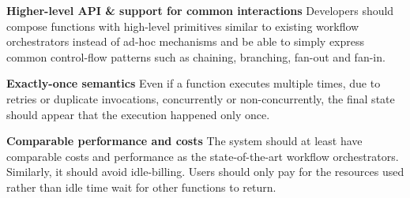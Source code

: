     \item \textbf{Higher-level API \& support for common interactions}
    Developers should compose functions with high-level primitives similar to
    existing workflow orchestrators instead of ad-hoc mechanisms and be able
    to simply express common control-flow patterns such as chaining,
    branching, fan-out and fan-in.

    \item \textbf{Exactly-once semantics} Even if a function executes multiple
    times, due to retries or duplicate invocations, concurrently or
    non-concurrently, the final state should appear that the execution
    happened only once.

    \item \textbf{Comparable performance and costs} The system should at least
    have comparable costs and performance as the state-of-the-art workflow
    orchestrators. Similarly, it should avoid idle-billing. Users should only pay
    for the resources used rather than idle time wait for other functions to
    return. 


\squishend





